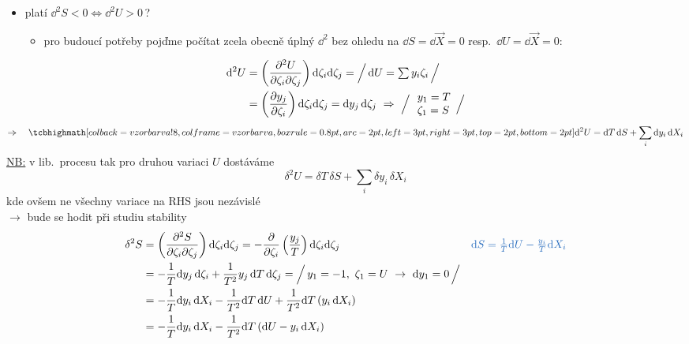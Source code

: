 \begin{itemize}
  \item platí $\dd^2S < 0 \Leftrightarrow \dd^2U > 0$\,?
  \begin{itemize}[nosep]
    \item[$\to$] pro budoucí potřeby pojďme počítat zcela obecně úplný $\dd^2$ bez ohledu na $\dd S = \dd\vec X = 0$ resp.\ $\dd U = \dd\vec X = 0$:
  \end{itemize}
\end{itemize}
\begin{align*}
  \dd^2U &= \left(\frac{\partial^2U}{\partial\zeta_i\partial\zeta_j}\right)\dd\zeta_i\dd\zeta_j
          = \Big/\,\dd U = \textstyle\sum y_i\zeta_i\,\Big/ \\
         &= \left(\pdv{y_j}{\zeta_i}\right)\dd\zeta_i\dd\zeta_j = \dd y_j\,\dd\zeta_j
          \ \Rightarrow\ \Big/\,\begin{array}{l} y_1 = T \\ \zeta_1 = S\end{array}\Big/
\end{align*}
\[
  \Rightarrow\quad \vzorec{\dd^2U = \dd T\,\dd S + \sum_i\dd y_i\,\dd X_i}
\]
\textcolor{NavyBlue}{\underline{NB:} v lib.\ procesu tak pro druhou variaci $U$ dostáváme
\[
  \boxed{\delta^2U = \delta T\,\delta S + \sum_i\delta y_i\,\delta X_i}
\]
kde ovšem ne všechny variace na RHS jsou nezávislé \\
$\to$ bude se hodit při studiu stability}
\begin{align*}
  \delta^2S &= \left(\frac{\partial^2S}{\partial\zeta_i\partial\zeta_j}\right)\dd\zeta_i\dd\zeta_j
             = -\pdv{\zeta_i}\left(\frac{y_j}{T}\right)\dd\zeta_i\dd\zeta_j
             &&\textcolor{NavyBlue}{\dd S = \tfrac1T\dd U - \tfrac{y_i}{T}\dd X_i} \\
            &= -\frac1T\dd y_j\,\dd\zeta_i + \frac{1}{T^2}y_j\,\dd T\,\dd\zeta_j
             = \Big/\,y_1 = -1,\ \zeta_1 = U \ \to\ \dd y_1 = 0\,\Big/ \\
            &= -\frac1T\dd y_i\,\dd X_i - \frac{1}{T^2}\dd T\,\dd U + \frac{1}{T^2}\dd T\,(y_i\,\dd X_i) \\
            &= -\frac1T\dd y_i\,\dd X_i - \frac{1}{T^2}\dd T\,(\dd U - y_i\,\dd X_i)
\end{align*}

